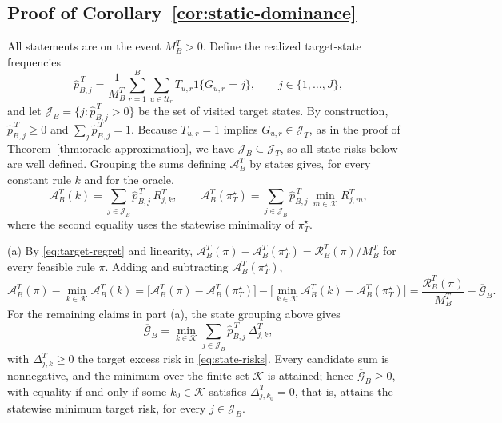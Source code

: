 \documentclass[a4paper, 12pt]{article}
\theoremstyle{plain}
\theoremstyle{remark}
\newcommand{\Kcal}{\mathcal{K}}
\newcommand{\Ucal}{\mathcal{U}}
\newcommand{\1}{\mathbf{1}}
\begin{document}
\subsection*{Proof of Corollary~\ref{cor:static-dominance}}
All statements are on the event \(M^T_B>0\). Define the realized target-state frequencies
\begin{equation*}
\widehat p^{\,T}_{B,j}
=\frac{1}{M^T_B}\sum_{r=1}^{B}\sum_{u\in\Ucal_r}T_{u,r}1\{G_{u,r}=j\},
\qquad j\in\{1,\ldots,J\},
\end{equation*}
and let \(\mathcal J_B=\{j:\widehat p^{\,T}_{B,j}>0\}\) be the set of visited target states. By construction, \(\widehat p^{\,T}_{B,j}\geq 0\) and \(\sum_j\widehat p^{\,T}_{B,j}=1\). Because \(T_{u,r}=1\) implies \(G_{u,r}\in\mathcal J_T\), as in the proof of Theorem~\ref{thm:oracle-approximation}, we have \(\mathcal J_B\subseteq\mathcal J_T\), so all state risks below are well defined. Grouping the sums defining \(\mathcal A^T_B\) by states gives, for every constant rule \(k\) and for the oracle,
\begin{equation*}
\mathcal A^T_B(k)=\sum_{j\in\mathcal J_B}\widehat p^{\,T}_{B,j}\,R^T_{j,k},
\qquad
\mathcal A^T_B(\pi^\star_T)=\sum_{j\in\mathcal J_B}\widehat p^{\,T}_{B,j}\,\min_{m\in\Kcal}R^T_{j,m},
\end{equation*}
where the second equality uses the statewise minimality of \(\pi^\star_T\).

(a) By \eqref{eq:target-regret} and linearity, \(\mathcal A^T_B(\pi)-\mathcal A^T_B(\pi^\star_T)=\mathcal R^T_B(\pi)/M^T_B\) for every feasible rule \(\pi\). Adding and subtracting \(\mathcal A^T_B(\pi^\star_T)\),
\begin{equation*}
\mathcal A^T_B(\pi)-\min_{k\in\Kcal}\mathcal A^T_B(k)
=\Big[\mathcal A^T_B(\pi)-\mathcal A^T_B(\pi^\star_T)\Big]
-\Big[\min_{k\in\Kcal}\mathcal A^T_B(k)-\mathcal A^T_B(\pi^\star_T)\Big]
=\frac{\mathcal R^T_B(\pi)}{M^T_B}-\overline{\mathcal G}_B .
\end{equation*}
For the remaining claims in part (a), the state grouping above gives
\begin{equation*}
\overline{\mathcal G}_B
=\min_{k\in\Kcal}\sum_{j\in\mathcal J_B}\widehat p^{\,T}_{B,j}\,\Delta^T_{j,k},
\end{equation*}
with \(\Delta^T_{j,k}\geq 0\) the target excess risk in \eqref{eq:state-risks}. Every candidate sum is nonnegative, and the minimum over the finite set \(\Kcal\) is attained; hence \(\overline{\mathcal G}_B\geq 0\), with equality if and only if some \(k_0\in\Kcal\) satisfies \(\Delta^T_{j,k_0}=0\), that is, attains the statewise minimum target risk, for every \(j\in\mathcal J_B\).
\end{document}
